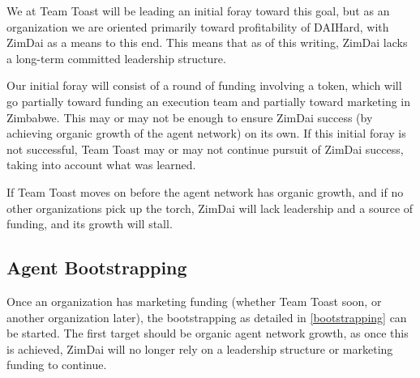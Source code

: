 \documentclass{article}
\begin{document}
We at Team Toast will be leading an initial foray toward this goal, but as an organization we are oriented primarily toward profitability of DAIHard, with ZimDai as a means to this end. This means that as of this writing, ZimDai lacks a long-term committed leadership structure.

Our initial foray will consist of a round of funding involving a token, which will go partially toward funding an execution team and partially toward marketing in Zimbabwe. This may or may not be enough to ensure ZimDai success (by achieving organic growth of the agent network) on its own. If this initial foray is not successful, Team Toast may or may not continue pursuit of ZimDai success, taking into account what was learned.

If Team Toast moves on before the agent network has organic growth, and if no other organizations pick up the torch, ZimDai will lack leadership and a source of funding, and its growth will stall.

\subsection{Agent Bootstrapping} \label{agent bootstrapping}

Once an organization has marketing funding (whether Team Toast soon, or another organization later), the bootstrapping as detailed in \ref{bootstrapping} can be started. The first target should be organic agent network growth, as once this is achieved, ZimDai will no longer rely on a leadership structure or marketing funding to continue.
\end{document}
